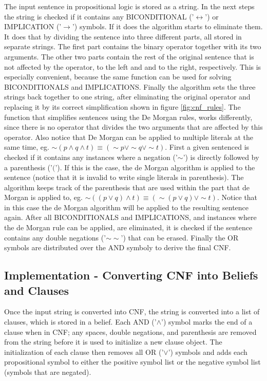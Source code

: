 \documentclass[a4paper,10pt]{article}
\begin{document}
The input sentence in propositional logic is stored as a string. In the next steps the string is checked if it contains any BICONDITIONAL ('$\leftrightarrow$') or IMPLICATION ('$\rightarrow$') symbols. If it does the algorithm starts to eliminate them. It does that by dividing the sentence into three different parts, all stored in separate strings. The first part contains the binary operator together with its two arguments. The other two parts contain the rest of the original sentence that is not affected by the operator, to the left and and to the right, respectively. This is especially convenient, because the same function can be used for solving BICONDITIONALS and IMPLICATIONS. Finally the algorithm sets the three strings back together to one string, after eliminating the original operator and replacing it by its correct simplification shown in figure \ref{fig:cnf_rules}.
The function that simplifies sentences using the De Morgan rules, works differently, since there is no operator that divides the two arguments that are affected by this operator. Also notice that De Morgan can be applied to multiple literals at the same time, eg. $\sim(p\wedge q\wedge t) \equiv (\sim p\vee\sim q\vee\sim t)$. First a given sentenced is checked if it contains any instances where a negation ('$\sim$') is directly followed by a parenthesis ('$($'). If this is the case, the de Morgan algorithm is applied to the sentence (notice that it is invalid to write single literals in parenthesis). The algorithm keeps track of the parenthesis that are used within the part that de Morgan is applied to, eg. $\sim((p\vee q)\wedge t) \equiv (\sim(p\vee q)\vee\sim t)$. Notice that in this case the de Morgan algorithm will be applied to the resulting sentence again.
After all BICONDITIONALS and IMPLICATIONS, and instances where the de Morgan rule can be applied, are eliminated, it is checked if the sentence contains any double negations ('$\sim\sim$') that can be erased.
Finally the OR symbols are distributed over the AND symboly to derive the final CNF.

\subsection{Implementation - Converting CNF into Beliefs and Clauses}
\label{subsec:implementation}
Once the input string is converted into CNF, the string is converted into a list of clauses, which is stored in a belief. Each AND ('$\wedge$') symbol marks the end of
a clause when in CNF; any spaces, double negations, and parenthesis are removed from the string before it is used to initialize a new clause object. The
initialization of each clause then removes all OR ('$\vee$') symbols and adds each propositional symbol to either the positive symbol list or the negative symbol list
(symbols that are negated).
\end{document}
